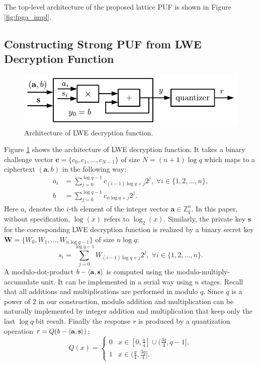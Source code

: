 The top-level architecture of the proposed lattice PUF is shown in Figure \ref{fig:fpga_impl}.



\subsection{Constructing Strong PUF from LWE Decryption Function}
\label{sec:lwe_dec}
\begin{figure}[t!]
    \centering
    \includegraphics[width = 0.8\linewidth]{./figs/lwe_dec.pdf}
    \caption{Architecture of LWE decryption function.}
    \label{fig:lwedec}
\end{figure}

Figure \ref{fig:lwedec} shows the architecture of LWE decryption function. 
It takes a binary challenge vector $\mathbf{c} = \{c_0,c_1,\ldots,c_{N-1}\}$ of size $N = (n+1)\log q$ which maps to a ciphertext $(\mathbf{a},b)$ in the following way:
\begin{align*}
a_i &= \sum_{j=0}^{\log q-1}c_{(i-1)\log q+j}2^j,\; \forall i\in \{1,2,\ldots,n\}, \\
b &= \sum_{j=0}^{\log q-1}c_{n\log q+j}2^j. 
\end{align*}
Here $a_i$ denotes the $i$-th element of the integer vector $\mathbf{a}\in\mathbb{Z}_q^n$.
In this paper, without specification, $\log(x)$ refers to $\log_2(x)$.
Similarly, the private key $\mathbf{s}$ for the corresponding LWE decryption function is realized by a binary secret key $\mathbf{W} =\{W_0,W_1,\ldots,W_{n\log q-1}\} $ of size $n\log q$:
\begin{equation*}
s_i=\sum_{j=0}^{\log q-1} W_{(i-1)\log q+j} 2^j,\; \forall i\in \{1,2,\ldots,n\}.
\end{equation*}
A modulo-dot-product $b-\langle\mathbf{a},\mathbf{s}\rangle$ is computed using the modulo-multiply-accumulate unit. 
It can be implemented in a serial way using $n$ stages. 
Recall that all additions and multiplications are performed in modulo $q$.
Since $q$ is a power of $2$ in our construction, modulo addition and multiplication can be naturally implemented by integer addition and multiplication that keep only the last $\log q$-bit result. 
Finally the response $r$ is produced by a quantization operation $r = Q(b-\langle\mathbf{a},\mathbf{s}\rangle)$: 
\begin{equation*}
Q(x) = \begin{cases}
	0& x \in [0,\frac{q}{4}]\cup(\frac{3q}{4},q-1],\\
	1& x \in (\frac{q}{4},\frac{3q}{4}].
\end{cases}
\end{equation*}

